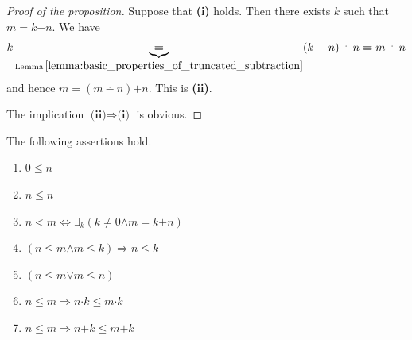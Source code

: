 \documentclass[10pt]{amsart}
\newcommand{\mexists}{\boldsymbol{\exists}}
\newcommand{\mra}{\boldsymbol{\Rightarrow}}
\newcommand{\mequiv}{\boldsymbol{\Leftrightarrow}}
\newcommand{\mand}{\boldsymbol{\wedge}}
\newcommand{\mor}{\boldsymbol{\vee}}
\newcommand{\mle}{\boldsymbol{<}}
\newcommand{\mleq}{\boldsymbol{\leq}}
\newcommand{\meq}{\boldsymbol{=}}
\newcommand{\mneq}{\boldsymbol{\neq}}
\newcommand{\mplus}{\boldsymbol{+}}
\newcommand{\mdot}{\boldsymbol{\cdot}}
\begin{document}
\begin{proof}[Proof of the proposition]
	Suppose that \textbf{(i)} holds. Then there exists $k$ such that $m \meq k \mplus n$. We have
	$$k \underbrace{\meq}_{\mathrm{Lemma\,}\ref{lemma:basic_properties_of_truncated_subtraction}} (k \mplus n) \dotminus n \meq m \dotminus n$$
	and hence $m \meq (m\dotminus n) \mplus n$. This is \textbf{(ii)}.

	The implication $\textbf{(ii)}\Rightarrow \textbf{(i)}$ is obvious.
\end{proof}

\begin{theorem}\label{theorem:order_is_linear_and_compatible_with_addition_and_multiplication}
	The following assertions hold.
	\begin{enumerate}[label=\emph{\textbf{(\arabic*)}}, leftmargin=3.0em]
		\item $0 \mleq n$
		\item $n \mleq n$
		\item $n \mle m \mequiv \mexists_k\left(k \mneq 0 \mand m \meq k \mplus n\right)$
		\item $\left(n \mleq m \mand m \mleq k\right) \mra n \mleq k$
		\item $\left(n \mleq m \mor m \mleq n\right)$
		\item $n \mleq m \mra n\mdot k \mleq m \mdot k$
		\item $n \mleq m \mra n \mplus k \mleq m \mplus k$
	\end{enumerate}
\end{theorem}
\end{document}
